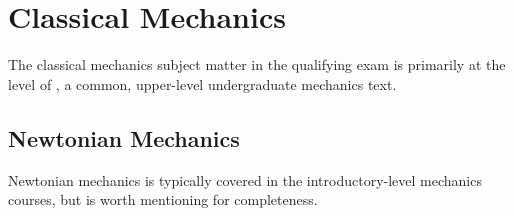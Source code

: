 \newpage
\section{Classical Mechanics}
The classical mechanics subject matter in the qualifying exam is primarily at the level of \cite{thorntonClassicalDynamicsParticles2004}, a common, upper-level undergraduate mechanics text.

\subsection{Newtonian Mechanics}
Newtonian mechanics is typically covered in the introductory-level mechanics courses, but is worth mentioning for completeness.

